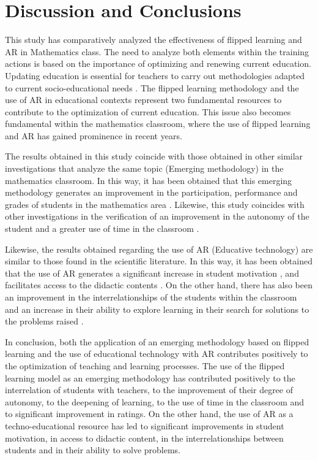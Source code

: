 \documentclass[english]{textolivre}
\begin{document}
\section{Discussion and Conclusions}
This study has comparatively analyzed the effectiveness of flipped learning and AR in Mathematics class. The need to analyze both elements within the training actions is based on the importance of optimizing and renewing current education. Updating education is essential for teachers to carry out methodologies adapted to current socio-educational needs \cite{area2016, larionova2018, pereira2019}. The flipped learning methodology \cite{sanchez2019, zainuddin2019} and the use of AR in educational contexts \cite{cabero2019, lorenzo2018} represent two fundamental resources to contribute to the optimization of current education. This issue also becomes fundamental within the mathematics classroom, where the use of flipped learning \cite{adams2018, amstelveen2019} and AR \cite{cahyono2020} has gained prominence in recent years.

The results obtained in this study coincide with those obtained in other similar investigations that analyze the same topic (Emerging methodology) in the mathematics classroom. In this way, it has been obtained that this emerging methodology generates an improvement in the participation, performance and grades of students in the mathematics area \cite{adams2018, amstelveen2019, sun2018}. Likewise, this study coincides with other investigations in the verification of an improvement in the autonomy of the student \cite{salas2019, touron2015} and a greater use of time in the classroom \cite{longcummins2017}.

Likewise, the results obtained regarding the use of AR (Educative technology) are similar to those found in the scientific literature. In this way, it has been obtained that the use of AR generates a significant increase in student motivation \cite{caberollorentegutierrez2017}, and facilitates access to the didactic contents \cite{barroso2017, marincabero2018}. On the other hand, there has also been an improvement in the interrelationships of the students within the classroom \cite{caberollorentemarin2017} and an increase in their ability to explore learning in their search for solutions to the problems raised \cite{fombonavazquez2017}. 

In conclusion, both the application of an emerging methodology based on flipped learning and the use of educational technology with AR contributes positively to the optimization of teaching and learning processes. The use of the flipped learning model as an emerging methodology has contributed positively to the interrelation of students with teachers, to the improvement of their degree of autonomy, to the deepening of learning, to the use of time in the classroom and to significant improvement in ratings. On the other hand, the use of AR as a techno-educational resource has led to significant improvements in student motivation, in access to didactic content, in the interrelationships between students and in their ability to solve problems.
\end{document}
